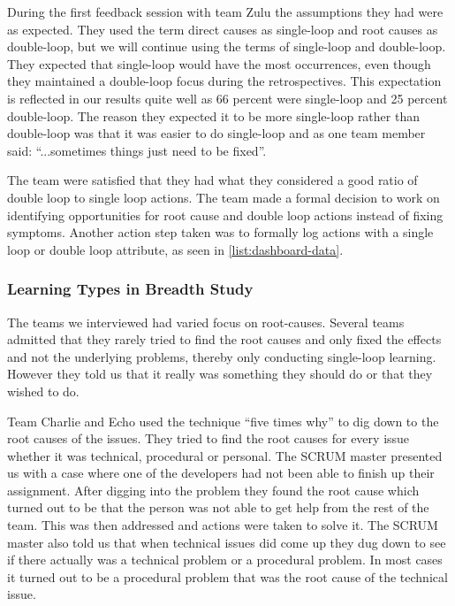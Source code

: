 During the first feedback session with team Zulu the assumptions they had were as expected. They used the term direct causes as single-loop and root causes as double-loop, but we will continue using the terms of single-loop and double-loop. They expected that single-loop would have the most occurrences, even though they maintained a double-loop focus during the retrospectives. This expectation is reflected in our results quite well as 66 percent were single-loop and 25 percent double-loop. The reason they expected it to be more single-loop rather than double-loop was that it was easier to do single-loop and as one team member said: ``...sometimes things just need to be fixed''. 

The team were satisfied that they had what they considered a good ratio of double loop to single loop actions. The team made a formal decision to work on identifying opportunities for root cause and double loop actions instead of fixing symptoms. Another action step taken was to formally log actions with a single loop or double loop attribute, as seen in \autoref{list:dashboard-data}.

\subsubsection{Learning Types in Breadth Study}
\label{question-13} 
The teams we interviewed had varied focus on root-causes. Several teams admitted that they rarely tried to find the root causes and only fixed the effects and not the underlying problems, thereby only conducting single-loop learning. However they told us that it really was something they should do or that they wished to do. 

Team Charlie and Echo used the technique ``five times why'' to dig down to the root causes of the issues. They tried to find the root causes for every issue whether it was technical, procedural or personal. The SCRUM master presented us with a case where one of the developers had not been able to finish up their assignment. After digging into the problem they found the root cause which turned out to be that the person was not able to get help from the rest of the team. This was then addressed and actions were taken to solve it. The SCRUM master also told us that when technical issues did come up they dug down to see if there actually was a technical problem or a procedural problem. In most cases it turned out to be a procedural problem that was the root cause of the technical issue.

